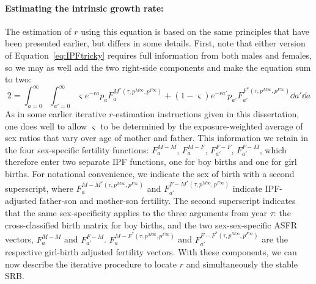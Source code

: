\paragraph{Estimating the intrinsic growth rate: } The estimation of
$r$ using this equation is based on the same principles that have been presented
earlier, but differs in some details. First, note
that either version of Equation~\eqref{eq:IPFtricky} requires full information from both
males and females, so we may as well add the two right-side components and make
the equation sum to two:
\begin{equation}
\label{eq:IPFugly}
2 = \int_{a=0}^\infty \int_{a'=0}^\infty \varsigma
e^{-ra}p_aF_a^{M^\ast(\tau,p^{M\infty}, p^{F\infty})} + (1-\varsigma)
e^{-ra'}p_{a'}F_{a'}^{F^\ast(\tau,p^{M\infty}, p^{F\infty})}\dd a' \dd a
\end{equation}
As in some earlier iterative $r$-estimation instructions given in this
dissertation, one does well to allow $\varsigma$ to be determined by the
exposure-weighted average of sex ratios that vary over age of mother and father.
This information we retain in the four sex-specific fertility functions:
$F_a^{M-M}$, $F_a^{M-F}$, $F_{a'}^{F-F}$, $F_{a'}^{F-M}$, which therefore enter two
separate IPF functions, one for boy births and one for girl births. For
notational convenience, we indicate the sex of birth with a second superscript,
where $F_a^{M-M^\ast(\tau,p^{M\infty}, p^{F\infty})}$ and
$F_{a'}^{F-M^\ast(\tau,p^{M\infty}, p^{F\infty})}$ indicate IPF-adjusted
father-son and mother-son fertility. The second superscript indicates that
the same sex-specificity applies to the three arguments from year $\tau$: the 
cross-classified birth matrix for boy births, and the two sex-sex-specific ASFR
vectors, $F_a^{M-M}$ and $F_{a'}^{F-M}$. $F_a^{M-F^\ast(\tau,p^{M\infty},
p^{F\infty})}$ and $F_{a'}^{F-F^\ast(\tau,p^{M\infty}, p^{F\infty})}$ are the
respective girl-birth adjusted fertility vectors. With these components, we can
now describe the iterative procedure to locate $r$ and simultaneously the stable
SRB.

